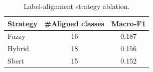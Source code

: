 \begin{table}[htbp]
\caption{Label-alignment strategy ablation.}
\label{tab:alignment}
\begin{tabular}{lcc}
\toprule
Strategy & \#Aligned classes & Macro-F1 \\
\midrule
Fuzzy & 16 & 0.187 \\
Hybrid & 18 & 0.156 \\
Sbert & 15 & 0.152 \\
\bottomrule
\end{tabular}
\end{table}
